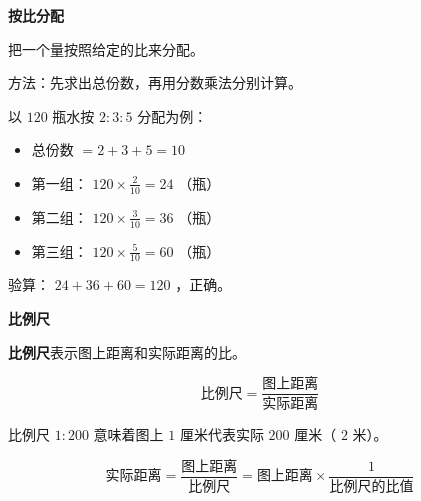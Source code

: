 \begin{understand}


\textbf{按比分配}

把一个量按照给定的比来分配。

方法：先求出总份数，再用分数乘法分别计算。

以 $120$ 瓶水按 $2 : 3 : 5$ 分配为例：
\begin{itemize}
  \item 总份数 $= 2 + 3 + 5 = 10$
  \item 第一组： $120 \times \frac{2}{10} = 24$ （瓶）
  \item 第二组： $120 \times \frac{3}{10} = 36$ （瓶）
  \item 第三组： $120 \times \frac{5}{10} = 60$ （瓶）
\end{itemize}


验算： $24 + 36 + 60 = 120$ ，正确。

\textbf{比例尺}

\textbf{比例尺}表示图上距离和实际距离的比。

\[
\text{比例尺} = \frac{\text{图上距离}}{\text{实际距离}}
\]


比例尺 $1 : 200$ 意味着图上 $1$ 厘米代表实际 $200$ 厘米（ $2$ 米）。

\[
\text{实际距离} = \frac{\text{图上距离}}{\text{比例尺}} = \text{图上距离} \times \frac{1}{\text{比例尺的比值}}
\]


\end{understand}

